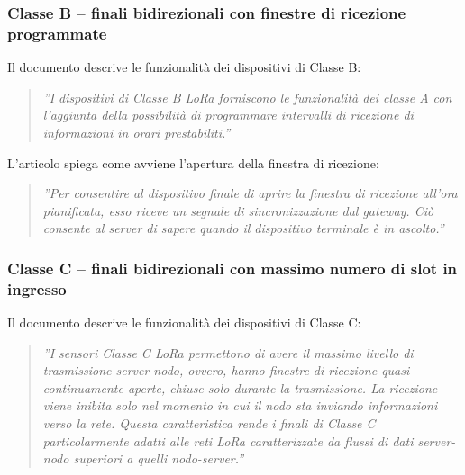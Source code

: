 \documentclass[a4paper]{report} %
\begin{document}
\subsubsection{Classe B – finali bidirezionali con finestre di ricezione programmate}
Il documento \cite{art:rif.27} descrive le funzionalità dei dispositivi di Classe B:
\begin{quote}
	\textit{''I dispositivi di Classe B LoRa forniscono le funzionalità dei classe A con l’aggiunta della possibilità di programmare intervalli di ricezione di informazioni in orari prestabiliti.''} 
\end{quote}
L'articolo \cite{art:rif.31} spiega come avviene l'apertura della finestra di ricezione:
\begin{quote}
	\textit{''Per consentire al dispositivo finale di aprire la finestra di ricezione all'ora pianificata, esso riceve un segnale di sincronizzazione dal gateway. Ciò consente al server di sapere quando il dispositivo terminale è in ascolto.''}
\end{quote}
\subsubsection{Classe C – finali bidirezionali con massimo numero di slot in ingresso}
Il documento \cite{art:rif.27} descrive le funzionalità dei dispositivi di Classe C:
\begin{quote}
	\textit{''I sensori Classe C LoRa permettono di avere il massimo livello di trasmissione server-nodo, ovvero, hanno finestre di ricezione quasi continuamente aperte, chiuse solo durante la trasmissione. La ricezione viene inibita solo nel momento in cui il nodo sta inviando informazioni verso la rete. Questa caratteristica rende i finali di Classe C particolarmente adatti alle reti LoRa caratterizzate da flussi di dati server-nodo superiori a quelli nodo-server.''}
\end{quote}

\end{document}
